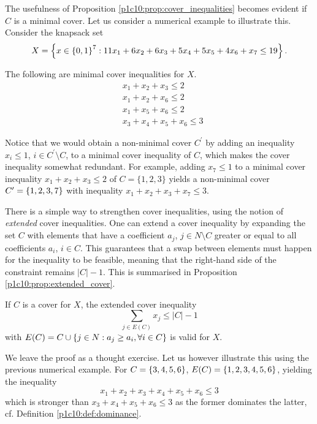 The usefulness of Proposition \ref{p1c10:prop:cover_inequalities} becomes evident if $C$ is a minimal cover. Let us consider a numerical example to illustrate this. Consider the knapsack set 
%
\begin{equation*}
	X = \left\{ x \in \left\{ 0,1 \right \}^7 : 11x_1 + 6x_2 + 6x_3 + 5x_4 + 5x_5 + 4x_6 + x_7 \leq 19 \right \}.	
\end{equation*}

The following are minimal cover inequalities for $X$. 
%
\begin{align*}
&x_1 + x_2 + x_3 \leq 2\\
&x_1 + x_2 +x_6 \leq 2\\
&x_1 + x_5 + x_6 \leq 2\\
&x_3 + x_4 + x_5 + x_6 \leq 3
\end{align*}

Notice that we would obtain a non-minimal cover $C^\prime$ by adding an inequality $x_i \leq 1$, $i \in C^\prime\setminus C$, to a minimal cover inequality of $C$, which makes the cover inequality somewhat redundant. For example, adding $x_7 \leq 1$ to a minimal cover inequality $x_1 + x_2 + x_3 \leq 2$ of $C = \{1,2,3\}$ yields a non-minimal cover $C^\prime = \left\{ 1,2,3,7 \right \}$ with inequality $x_1 + x_2 + x_3 + x_7 \leq 3$.

There is a simple way to strengthen cover inequalities, using the notion of \emph{extended} cover inequalities. One can extend a cover inequality by expanding the set $C$ with elements that have a coefficient $a_j$, $j \in N \setminus C$ greater or equal to all coefficients $a_i$, $i \in C$. This guarantees that a swap between elements must happen for the inequality to be feasible, meaning that the right-hand side of the constraint remains $|C| - 1$. This is summarised in Proposition \ref{p1c10:prop:extended_cover}.

\begin{proposition} \label{p1c10:prop:extended_cover}
	If $C$ is a cover for $X$, the extended cover inequality
	\begin{equation*}
		\sum_{j \in E(C)} x_j \leq |C|-1
	\end{equation*}
	with $E(C) = C \cup \left\{ j\in N: a_j \geq a_i, \forall i \in C \right \}$ is valid for $X$.
\end{proposition}

We leave the proof as a thought exercise. Let us however illustrate this using the previous numerical example. For $C = \left\{ 3,4,5,6 \right \}$, $E(C) = \left\{ 1,2,3,4,5,6 \right \}$, yielding the inequality 
%
\begin{equation*}
	x_1 + x_2 + x_3 + x_4 + x_5 + x_6 \leq 3	
\end{equation*}
%
which is stronger than $x_3 + x_4 + x_5 + x_6 \leq 3$ as the former dominates the latter, cf. Definition \ref{p1c10:def:dominance}. 

